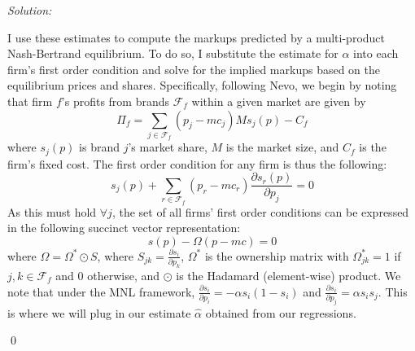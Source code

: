 \documentclass[12pt]{article}
\newenvironment{sol}
    {\emph{Solution:}
    }
    {
    \qed
    }
\begin{document}
\begin{sol}
I use these estimates to compute the markups predicted by a multi-product Nash-Bertrand equilibrium. To do so, I substitute the estimate for $\alpha$ into each firm's first order condition and solve for the implied markups based on the equilibrium prices and shares. Specifically, following Nevo, we begin by noting that firm $f$'s profits from brands $\mathcal{F}_f$ within a given market are given by
\[\Pi_f = \sum_{j \in \mathcal{F}_f} (p_j - mc_j)M s_j(p) - C_f\]
where $s_j(p)$ is brand $j$'s market share, $M$ is the market size, and $C_f$ is the firm's fixed cost. The first order condition for any firm is thus the following:
\[s_j(p) + \sum_{r \in \mathcal{F}_f} (p_r - mc_r) \frac{\partial s_r(p)}{\partial p_j} = 0\]
As this must hold $\forall j$, the set of all firms' first order conditions can be expressed in the following succinct vector representation:
\[s(p) - \Omega(p - mc) = 0\]
where $\Omega = \Omega^* \odot S$, where $S_{jk} = \frac{\partial s_i}{\partial p_k}$, $\Omega^*$ is the ownership matrix with $\Omega^*_{jk} = 1$ if $j,k \in \mathcal{F}_f$ and 0 otherwise, and $\odot$ is the Hadamard (element-wise) product. We note that under the MNL framework, $\frac{\partial s_i}{\partial p_i} = -\alpha s_i (1-s_i)$ and $\frac{\partial s_i}{\partial p_j} = \alpha s_i s_j$. This is where we will plug in our estimate $\hat{\alpha}$ obtained from our regressions.


\end{sol}
\end{document}
